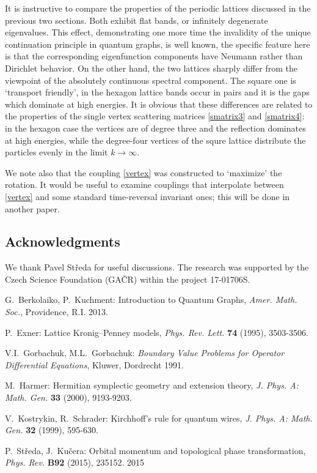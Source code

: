 \documentclass[english]{elsarticle}
\begin{document}
It is instructive to compare the properties of the periodic lattices discussed in the previous two sections. Both exhibit flat bands, or infinitely degenerate eigenvalues. This effect, demonstrating one more time the invalidity of the unique continuation principle in quantum graphs, is well known, the specific feature here is that the corresponding eigenfunction components have Neumann rather than Dirichlet behavior. On the other hand, the two lattices sharply differ from the viewpoint of the absolutely continuous spectral component. The square one is `transport friendly', in the hexagon lattice bands occur in pairs and it is the gaps which dominate at high energies. It is obvious that these differences are related to the properties of the single vertex scattering matrices \eqref{smatrix3} and \eqref{smatrix4}: in the hexagon case the vertices are of degree three and the reflection dominates at high energies, while the degree-four vertices of the squre lattice distribute the particles evenly in the limit $k\to\infty$.

We note also that the coupling \eqref{vertex} was constructed to `maximize' the rotation. It would be useful to examine couplings that interpolate between \eqref{vertex} and some standard time-reversal invariant ones; this will be done in another paper.


\subsection*{Acknowledgments}
\noindent We thank Pavel St\v{r}eda for useful discussions. The research was supported by the Czech Science
Foundation (GA\v{C}R) within the project 17-01706S.

\begin{thebibliography}{13}

G.~Berkolaiko, P.~Kuchment: Introduction to Quantum Graphs, \emph{Amer. Math. Soc.}, Providence, R.I. 2013.

P.~Exner: Lattice Kronig--Penney models, \emph{Phys. Rev. Lett.} \textbf{74} (1995), 3503-3506.

V.I.~Gorbachuk, M.L.~Gorbachuk: \emph{Boundary Value Problems for Operator Differential Equations}, Kluwer, Dordrecht 1991.

M.~Harmer: Hermitian symplectic geometry and extension theory, \emph{J. Phys. A: Math. Gen.} \textbf{33} (2000), 9193-9203.

V.~Kostrykin, R.~Schrader: Kirchhoff's rule for quantum wires, \emph{J. Phys. A: Math. Gen.} \textbf{32} (1999),  595-630.

P.~St\v{r}eda, J.~Ku\v{c}era: Orbital momentum and topological phase transformation, \emph{Phys. Rev.} \textbf{B92} (2015), 235152. 2015









\end{thebibliography}
\end{document}

